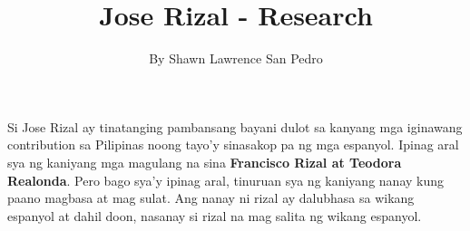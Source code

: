 \documentclass{article}
\title{\Huge Jose Rizal - Research}
\date{}
\author{\Large By Shawn Lawrence San Pedro}
\begin{document}
\maketitle
\newpage
\Large
Si Jose Rizal ay tinatanging pambansang bayani dulot sa kanyang mga iginawang
contribution sa Pilipinas noong tayo'y sinasakop pa ng mga espanyol. Ipinag aral sya
ng kaniyang mga magulang na sina \textbf{Francisco Rizal at Teodora Realonda}.
Pero bago sya'y ipinag aral, tinuruan sya ng kaniyang nanay kung paano magbasa
at mag sulat. Ang nanay ni rizal ay dalubhasa sa wikang espanyol at dahil doon,
nasanay si rizal na mag salita ng wikang espanyol.
\end{document}
